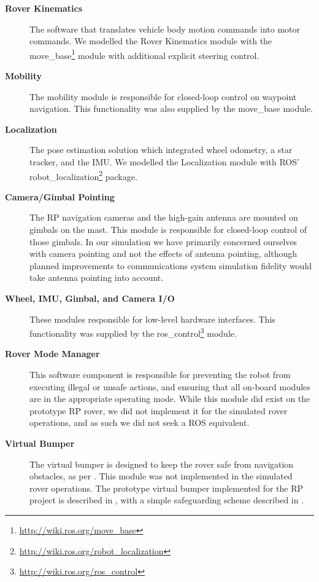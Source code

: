 \documentclass[twocolumn,letterpaper]{IEEEAerospaceCLS}  %
\begin{document}
\begin{description}
\item[\textbf{Rover Kinematics}] The software that translates vehicle body motion commands into motor commands.  We modelled the Rover Kinematics module with the move\_base\footnote{\url{http://wiki.ros.org/move_base}} module with additional explicit steering control.
\item[\textbf{Mobility}] The mobility module is responsible for closed-loop control on waypoint navigation.  This functionality was also supplied by the move\_base module.  
\item[\textbf{Localization}]  The pose estimation solution which integrated wheel odometry, a star tracker, and the IMU.  We modelled the Localization module with ROS' robot\_localization\footnote{\url{http://wiki.ros.org/robot_localization}} package.
\item[\textbf{Camera/Gimbal Pointing}] The RP navigation cameras and the high-gain antenna are mounted on gimbals on the mast.  This module is responsible for closed-loop control of those gimbals.  
In our simulation we have primarily concerned ourselves with camera pointing and not the effects of antenna pointing, although planned improvements to communications system simulation fidelity would take antenna pointing into account.  
\item[\textbf{Wheel, IMU, Gimbal, and Camera I/O}]  These modules responsible for low-level hardware interfaces.  This functionality was supplied by the ros\_control\footnote{\url{http://wiki.ros.org/ros_control}} module.
\item[\textbf{Rover Mode Manager}] This software component is responsible for preventing the robot from executing illegal or unsafe actions, and ensuring that all on-board modules are in the appropriate operating mode.  
While this module did exist on the prototype RP rover, we did not implement it for the simulated rover operations, and as such we did not seek a ROS equivalent.
\item[\textbf{Virtual Bumper}]  The virtual bumper is designed to keep the rover safe from navigation obstacles, as per \cite{matthies1997fast}.  
This module was not implemented in the simulated rover operations.  
The prototype virtual bumper implemented for the RP project is described in \cite{nefian2017structured}, with a simple safeguarding scheme described in \cite{furlong2016safeguarding}.
\end{description}

\end{document}
